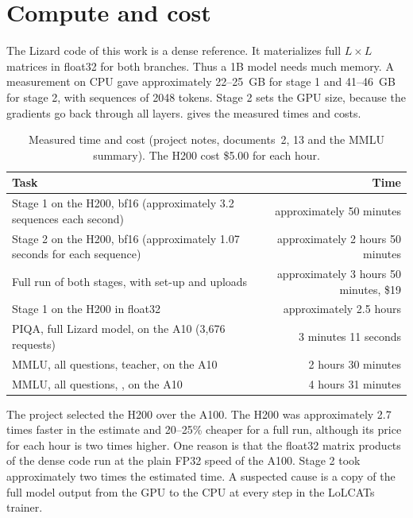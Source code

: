 \section{Compute and cost}
\label{sec:compute}

The Lizard code of this work is a dense reference. It materializes full $L \times L$ matrices in float32 for both branches. Thus a 1B model needs much memory. A measurement on CPU gave approximately 22--25~GB for stage 1 and 41--46~GB for stage 2, with sequences of 2048 tokens. Stage 2 sets the GPU size, because the gradients go back through all layers.  gives the measured times and costs.

\begin{table}[ht]
\centering
\small
\caption[Measured time and cost]{Measured time and cost (project notes, documents~2, 13 and the MMLU summary). The H200 cost \$5.00 for each hour.}
\label{tab:compute}
\begin{tabularx}{\linewidth}{@{}Lr@{}}
\toprule
Task & Time \\
\midrule
Stage 1 on the H200, bf16 (approximately 3.2 sequences each second) & approximately 50 minutes \\
Stage 2 on the H200, bf16 (approximately 1.07 seconds for each sequence) & approximately 2 hours 50 minutes \\
Full run of both stages, with set-up and uploads & approximately 3 hours 50 minutes, \$19 \\
Stage 1 on the H200 in float32 & approximately 2.5 hours \\
PIQA, full Lizard model, on the A10 (3,676 requests) & 3 minutes 11 seconds \\
MMLU, all questions, teacher, on the A10 & 2 hours 30 minutes \\
MMLU, all questions, , on the A10 & 4 hours 31 minutes \\
\bottomrule
\end{tabularx}
\end{table}

The project selected the H200 over the A100. The H200 was approximately 2.7 times faster in the estimate and 20--25\% cheaper for a full run, although its price for each hour is two times higher. One reason is that the float32 matrix products of the dense code run at the plain FP32 speed of the A100. Stage 2 took approximately two times the estimated time. A suspected cause is a copy of the full model output from the GPU to the CPU at every step in the LoLCATs trainer.

